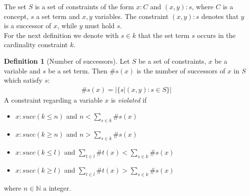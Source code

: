 \documentclass[a4paper,11pt]{scrartcl}
\theoremstyle{definition}
\newtheorem{mydef}{Definition}
\begin{document}
The set $S$ is a set of constraints of the form $x:C$ and $(x,y):s$, where $C$ is a concept, $s$ a set term and $x,y$ variables. The constraint $(x,y):s$ denotes that $y$ is a successor of $x$, while $y$ must hold $s$.\\
For the next definition we denote with $s\in k$ that the set term $s$ occurs in the cardinality constraint $k$.
\begin{mydef}[Number of successors]
Let $S$ be a set of constraints, $x$ be a variable and $s$ be a set term. Then $\#s(x)$ is the number of successors of $x$ in $S$ which satisfy $s$:
\begin{align*}
\#s(x)=|\{s|(x,y):s\in S\}|
\end{align*}
A constraint regarding a variable $x$ is \textit{violated} if
\begin{itemize}
\item $x:succ(k\leq n)$ and $n<\sum_{s\in k}\#s(x)$
\item $x:succ(k\geq n)$ and $n>\sum_{s\in k}\#s(x)$
\item $x:succ(k\leq l)$ and $\sum_{t\in l}\#t(x)<\sum_{s\in k}\#s(x)$
\item $x:succ(k\geq l)$ and $\sum_{t\in l}\#t(x)>\sum_{s\in k}\#s(x)$
\end{itemize} 
where $n\in\mathbb{N}$ a integer.
\end{mydef}
\end{document}
